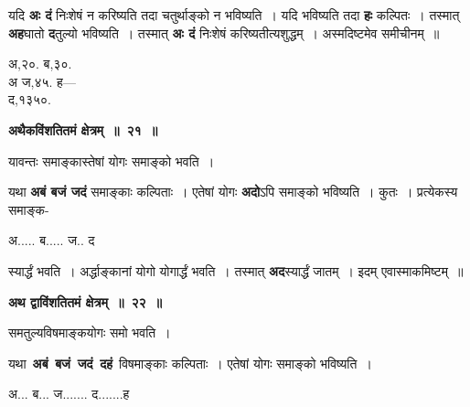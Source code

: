 \documentclass[11pt, openany]{book}
\begin{document}
\begin{flushleft}
\begin{minipage}[t]{0.7\textwidth}
\hspace{4mm} यदि \textbf{अः दं} निःशेषं न करिष्यति तदा चतुर्थाङ्को न भविष्यति~। यदि भविष्यति तदा \textbf{हः} कल्पितः~। तस्मात् \textbf{अह}घातो \textbf{द}तुल्यो भविष्यति~। तस्मात् \textbf{अः दं} निःशेषं करिष्यतीत्यशुद्धम्~। अस्मदिष्टमेव  समीचीनम्~॥ 
\end{minipage} 
\hfill
\begin{minipage}[t]{0.2\textwidth}
अ,२०. ब,३०.\\ 
{\color{white}अ} ज,४५. ह--- \\
द,१३५०.
\end{minipage}
\end{flushleft}
\vspace{-1mm}

\begin{center}
\textbf{\large अथैकविंशतितमं क्षेत्रम्~॥~२१~॥}
\end{center}

{\ab  यावन्तः समाङ्कास्तेषां योगः समाङ्को भवति~।} 

\begin{flushleft}
\begin{minipage}[t]{0.65\textwidth}
\hspace{4mm}  यथा \textbf{अबं बजं जदं} समाङ्काः कल्पिताः~। एतेषां योगः \textbf{अदो}ऽपि समाङ्को भविष्यति~। कुतः~। प्रत्येकस्य समाङ्क-
\end{minipage} 
\hfill
\begin{minipage}[t]{0.25\textwidth}
अ..... ब..... ज.. द
\end{minipage}
\end{flushleft}
\vspace{-3mm}

\noindent स्यार्द्धं भवति~। अर्द्धाङ्कानां योगो योगार्द्धं भवति~। तस्मात् \textbf{अद}स्यार्द्धं जातम्~। इदम् एवास्माकमिष्टम्~॥ 
\vspace{2mm}

\begin{center}
\textbf{\large अथ द्वाविंशतितमं क्षेत्रम्~॥~२२~॥} 
\end{center}

{\ab  समतुल्यविषमाङ्कयोगः समो भवति~। }

\begin{flushleft}
\begin{minipage}[t]{0.5\textwidth}
\hspace{4mm}  यथा \,\textbf{अबं \,बजं \,जदं \,दहं} \,विषमाङ्काः कल्पिताः~। एतेषां योगः समाङ्को भविष्यति~।
\end{minipage} 
\hfill
\begin{minipage}[t]{0.4\textwidth}
अ... ब... ज....... द.......ह
\end{minipage}
\end{flushleft}
\vspace{-3mm}
\end{document}
